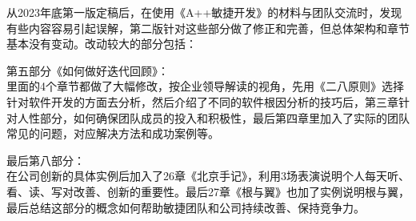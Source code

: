 从2023年底第一版定稿后，在使用《A++敏捷开发》的材料与团队交流时，发现有些内容容易引起误解，第二版针对这些部分做了修正和完善，但总体架构和章节基本没有变动。改动较大的部分包括：

第五部分《如何做好迭代回顾》：\\
里面的4个章节都做了大幅修改，按企业领导解读的视角，先用《二八原则》选择针对软件开发的方面去分析，然后介绍了不同的软件根因分析的技巧后，第三章针对人性部分，如何确保团队成员的投入和积极性，最后第四章里加入了实际的团队常见的问题，对应解决方法和成功案例等。

最后第八部分：\\
在公司创新的具体实例后加入了26章《北京手记》，利用3场表演说明个人每天听、看、读、写对改善、创新的重要性。最后27章《根与翼》也加了实例说明根与翼，最后总结这部分的概念如何帮助敏捷团队和公司持续改善、保持竞争力。


